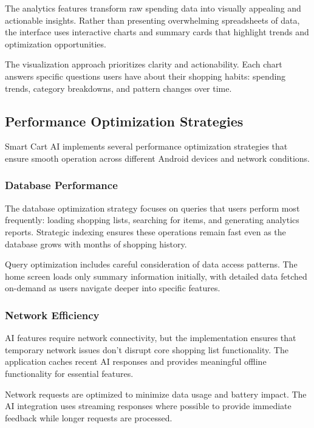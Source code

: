 \documentclass[11pt,a4paper]{article}
\begin{document}
The analytics features transform raw spending data into visually appealing and actionable insights. Rather than presenting overwhelming spreadsheets of data, the interface uses interactive charts and summary cards that highlight trends and optimization opportunities.

The visualization approach prioritizes clarity and actionability. Each chart answers specific questions users have about their shopping habits: spending trends, category breakdowns, and pattern changes over time.

\subsection{Performance Optimization Strategies}

Smart Cart AI implements several performance optimization strategies that ensure smooth operation across different Android devices and network conditions.

\subsubsection{Database Performance}

The database optimization strategy focuses on queries that users perform most frequently: loading shopping lists, searching for items, and generating analytics reports. Strategic indexing ensures these operations remain fast even as the database grows with months of shopping history.

Query optimization includes careful consideration of data access patterns. The home screen loads only summary information initially, with detailed data fetched on-demand as users navigate deeper into specific features.

\subsubsection{Network Efficiency}

AI features require network connectivity, but the implementation ensures that temporary network issues don't disrupt core shopping list functionality. The application caches recent AI responses and provides meaningful offline functionality for essential features.

Network requests are optimized to minimize data usage and battery impact. The AI integration uses streaming responses where possible to provide immediate feedback while longer requests are processed.
\end{document}
